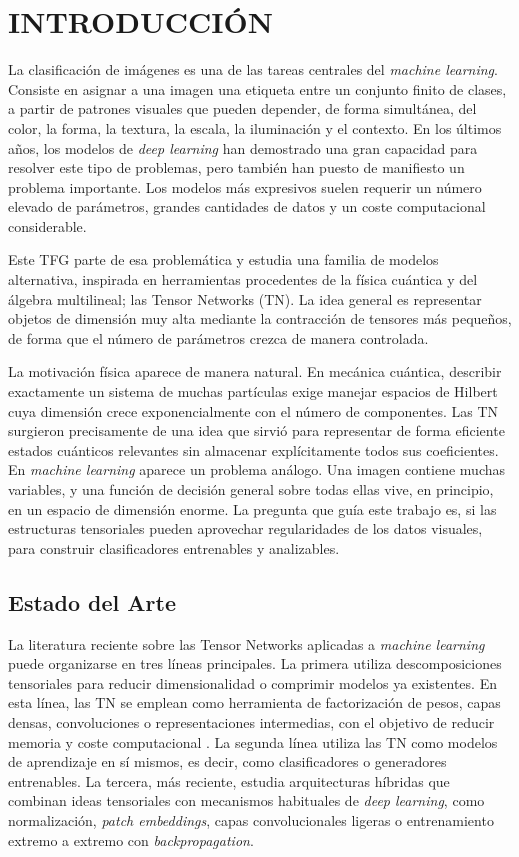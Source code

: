 \chapter{INTRODUCCIÓN}\label{sec:Intro}

La clasificación de imágenes es una de las tareas centrales del \textit{machine learning}. Consiste en asignar a una imagen una etiqueta entre un conjunto finito de clases, a partir de patrones visuales que pueden depender, de forma simultánea, del color, la forma, la textura, la escala, la iluminación y el contexto. En los últimos años, los modelos de \textit{deep learning} han demostrado una gran capacidad para resolver este tipo de problemas, pero también han puesto de manifiesto un problema importante. Los modelos más expresivos suelen requerir un número elevado de parámetros, grandes cantidades de datos y un coste computacional considerable.

Este TFG parte de esa problemática y estudia una familia de modelos alternativa, inspirada en herramientas procedentes de la física cuántica y del álgebra multilineal; las Tensor Networks (TN). La idea general es representar objetos de dimensión muy alta mediante la contracción de tensores más pequeños, de forma que el número de parámetros crezca de manera controlada.

La motivación física aparece de manera natural. En mecánica cuántica, describir exactamente un sistema de muchas partículas exige manejar espacios de Hilbert cuya dimensión crece exponencialmente con el número de componentes. Las TN surgieron precisamente de una idea que sirvió para representar de forma eficiente estados cuánticos relevantes sin almacenar explícitamente todos sus coeficientes. En \textit{machine learning} aparece un problema análogo. Una imagen contiene muchas variables, y una función de decisión general sobre todas ellas vive, en principio, en un espacio de dimensión enorme. La pregunta que guía este trabajo es, si las estructuras tensoriales pueden aprovechar regularidades de los datos visuales, para construir clasificadores entrenables y analizables.

\section{Estado del Arte}

La literatura reciente sobre las Tensor Networks aplicadas a \textit{machine learning} puede organizarse en tres líneas principales. La primera utiliza descomposiciones tensoriales para reducir dimensionalidad o comprimir modelos ya existentes. En esta línea, las TN se emplean como herramienta de factorización de pesos, capas densas, convoluciones o representaciones intermedias, con el objetivo de reducir memoria y coste computacional . La segunda línea utiliza las TN como modelos de aprendizaje en sí mismos, es decir, como clasificadores o generadores entrenables. La tercera, más reciente, estudia arquitecturas híbridas que combinan ideas tensoriales con mecanismos habituales de \textit{deep learning}, como normalización, \textit{patch embeddings}, capas convolucionales ligeras o entrenamiento extremo a extremo con \textit{backpropagation}.

